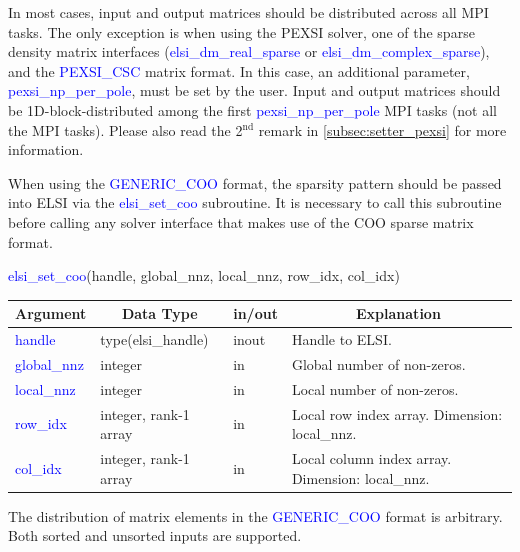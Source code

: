 \documentclass{report}
\begin{document}
In most cases, input and output matrices should be distributed across all MPI tasks. The only exception is when using the PEXSI solver, one of the sparse density matrix interfaces (\textcolor{blue}{elsi\_dm\_real\_sparse} or \textcolor{blue}{elsi\_dm\_complex\_sparse}), and the \textcolor{blue}{PEXSI\_CSC} matrix format. In this case, an additional parameter, \textcolor{blue}{pexsi\_np\_per\_pole}, must be set by the user. Input and output matrices should be 1D-block-distributed among the first \textcolor{blue}{pexsi\_np\_per\_pole} MPI tasks (not all the MPI tasks). Please also read the 2$^\text{nd}$ remark in \ref{subsec:setter_pexsi} for more information.

When using the \textcolor{blue}{GENERIC\_COO} format, the sparsity pattern should be passed into ELSI via the \textcolor{blue}{elsi\_set\_coo} subroutine. It is necessary to call this subroutine before calling any solver interface that makes use of the COO sparse matrix format.
\begin{labeling}{\hspace{6cm}}
\item [\hspace{0.3cm} \textcolor{blue}{elsi\_set\_coo}(handle, global\_nnz, local\_nnz, row\_idx, col\_idx)]
\end{labeling}

\begin{tabular}[]{|p{30mm}|p{35mm}|p{15mm}|p{85mm}|}
\hline
\multicolumn{1}{|c|}{\textbf{Argument}} & \multicolumn{1}{c|}{\textbf{Data Type}} & \multicolumn{1}{c|}{\textbf{in/out}} & \multicolumn{1}{c|}{\textbf{Explanation}}\\
\hline
\textcolor{blue}{handle}      & type(elsi\_handle)    & inout & Handle to ELSI.\\
\hline
\textcolor{blue}{global\_nnz} & integer               & in    & Global number of non-zeros.\\
\hline
\textcolor{blue}{local\_nnz}  & integer               & in    & Local number of non-zeros.\\
\hline
\textcolor{blue}{row\_idx}    & integer, rank-1 array & in    & Local row index array. Dimension: local\_nnz.\\
\hline
\textcolor{blue}{col\_idx}    & integer, rank-1 array & in    & Local column index array. Dimension: local\_nnz.\\
\hline
\end{tabular}

The distribution of matrix elements in the \textcolor{blue}{GENERIC\_COO} format is arbitrary. Both sorted and unsorted inputs are supported.
\end{document}
